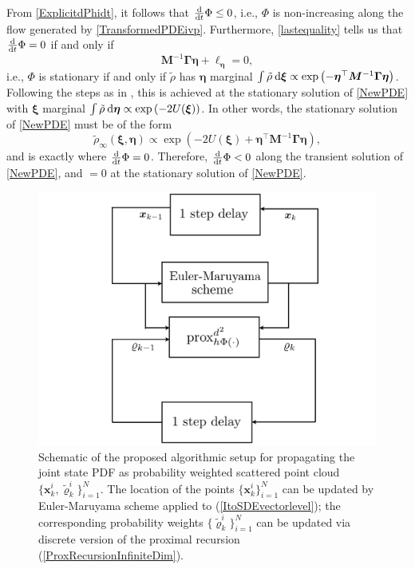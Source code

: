 \documentclass[10pt,twocolumn]{IEEEtran}
\newcommand{\differential}{{\rm{d}}}
\begin{document}
From \eqref{ExplicitdPhidt}, it follows that $\frac{\differential}{\differential t}\Phi \leq 0$, i.e., $\Phi$ is non-increasing along the flow generated by \eqref{TransformedPDEivp}. Furthermore, \eqref{lastequality} tells us that $\frac{\differential}{\differential t}\Phi = 0$ if and only if 
$$\bm{M}^{-1}\bm{\Gamma}\bm{\eta} + \bm{\ell}_{\bm{\eta}} = 0,$$
i.e., $\Phi$ is stationary if and only if $\tilde{\rho}$ has $\bm{\eta}$ marginal $\int\tilde{\rho}\:\differential\bm{\xi} \propto \exp\left(-\bm{\eta}^{\top}\bm{M}^{-1}\bm{\Gamma}\bm{\eta}\right)$. Following the steps as in \cite[Appendix E.1]{krichene2020global}, this is achieved at the stationary solution of \eqref{NewPDE} with $\bm{\xi}$ marginal $\int\tilde{\rho}\:\differential\bm{\eta} \propto \exp\left(-2U(\bm{\xi})\right)$. In other words, the stationary solution of \eqref{NewPDE} must be of the form 
$$\tilde{\rho}_{\infty}(\bm{\xi},\bm{\eta}) \propto \exp\left(-2U(\bm{\xi})+\bm{\eta}^{\top}\bm{M}^{-1}\bm{\Gamma}\bm{\eta}\right),$$
and is exactly where $\frac{\differential}{\differential t}\Phi = 0$. Therefore, $\frac{\differential}{\differential t}\Phi < 0$ along the transient solution of \eqref{NewPDE}, and $=0$ at the stationary solution of \eqref{NewPDE}.










\begin{figure}
\centering
\includegraphics[width=.8\linewidth]{BlockDiagm.pdf}
\caption{\small{Schematic of the proposed algorithmic setup for propagating the joint state PDF as probability weighted scattered point cloud $\{\bm{x}_{k}^{i},\tilde{\varrho}_{k}^{i}\}_{i=1}^{N}$. The location of the points $\{\bm{x}_{k}^{i}\}_{i=1}^{N}$ can be updated by Euler-Maruyama scheme applied to (\ref{ItoSDEvectorlevel}); the corresponding probability weights $\{\tilde{\varrho}_{k}^{i}\}_{i=1}^{N}$ can be updated via discrete version of the proximal recursion (\ref{ProxRecursionInfiniteDim}).}}
\label{fig:BlockDiagm}
\end{figure}
\end{document}
